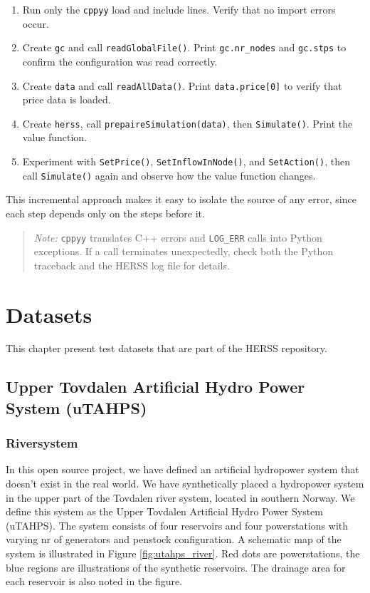 \documentclass[a4paper, 12pt]{report}
\begin{document}
	\begin{enumerate}
		\item Run only the \texttt{cppyy} load and include lines. Verify that
		no import errors occur.
		\item Create \texttt{gc} and call \texttt{readGlobalFile()}. Print
		\texttt{gc.nr\_nodes} and \texttt{gc.stps} to confirm the
		configuration was read correctly.
		\item Create \texttt{data} and call \texttt{readAllData()}. Print
		\texttt{data.price[0]} to verify that price data is loaded.
		\item Create \texttt{herss}, call \texttt{prepaireSimulation(data)},
		then \texttt{Simulate()}. Print the value function.
		\item Experiment with \texttt{SetPrice()}, \texttt{SetInflowInNode()},
		and \texttt{SetAction()}, then call \texttt{Simulate()} again and
		observe how the value function changes.
	\end{enumerate}

	\noindent This incremental approach makes it easy to isolate the source of
	any error, since each step depends only on the steps before it.

	\begin{quote}
		\textit{Note:} \texttt{cppyy} translates C++ errors and \texttt{LOG\_ERR}
		calls into Python exceptions. If a call terminates unexpectedly, check both
		the Python traceback and the HERSS log file for details.
	\end{quote}

	\chapter{Datasets}
	This chapter present test datasets that are part of the HERSS repository.
	
	\section{Upper Tovdalen Artificial Hydro Power System (uTAHPS)}
	
	\subsection{Riversystem}
	In this open source project, we have defined an artificial hydropower system that doesn’t exist in
	the real world. We have synthetically placed a hydropower system in the upper part of the
	Tovdalen river system, located in southern Norway. We define this system as the Upper Tovdalen
	Artificial Hydro Power System (uTAHPS). The system consists of four reservoirs and four
	powerstations with varying nr of generators and penstock configuration. A schematic map of the
	system is illustrated in Figure \ref{fig:utahps_river}. Red dots are powerstations, the blue regions are illustrations of the synthetic reservoirs. 
	The drainage area for each reservoir is also noted in the figure. 
	
\end{document}
